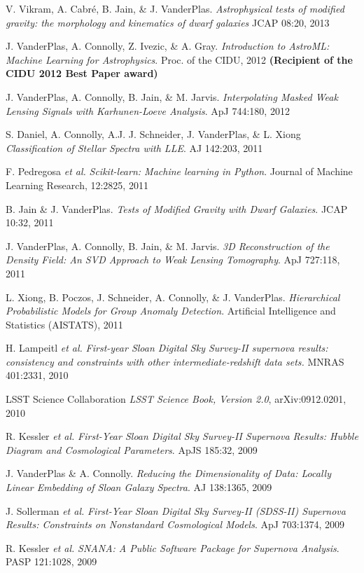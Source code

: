 \documentclass{article} %
\def\bf{\bfseries}
\def\sl{\slshape}
\begin{document}
{\begin{itemize}[leftmargin=0ex, itemsep=0ex, parsep=.5ex, labelindent=-4ex]
    \publication
      V. Vikram, A. Cabr\'{e}, B. Jain, \& J. VanderPlas.
      {\it Astrophysical tests of modified gravity:
        the morphology and kinematics of dwarf galaxies}
      JCAP 08:20, 2013

    \publication
      J. VanderPlas, A. Connolly, Z. Ivezic, \& A. Gray.
      {\sl Introduction to AstroML: Machine Learning for Astrophysics}.
      Proc. of the CIDU, 2012
      {\bf (Recipient of the CIDU 2012 Best Paper award)}

    \publication
      J. VanderPlas, A. Connolly, B. Jain, \& M. Jarvis.
      {\it Interpolating Masked Weak Lensing Signals with Karhunen-Loeve
        Analysis}.
      ApJ 744:180, 2012

    \publication
      S. Daniel, A. Connolly, A.J. J. Schneider, J. VanderPlas, \& L. Xiong
      {\sl Classification of Stellar Spectra with LLE}.
      AJ 142:203, 2011

    \publication
      F. Pedregosa {\sl et al.}
      {\sl Scikit-learn: Machine learning in Python}.
      Journal of Machine Learning Research, 12:2825, 2011

    \publication
      B. Jain \& J. VanderPlas.
      {\sl Tests of Modified Gravity with Dwarf Galaxies}.
      JCAP 10:32, 2011

    \publication
      J. VanderPlas, A. Connolly, B. Jain, \& M. Jarvis.
      {\sl 3D Reconstruction of the Density Field: An SVD Approach
        to Weak Lensing Tomography}.
      ApJ 727:118, 2011

    \publication
      L. Xiong, B. Poczos, J. Schneider, A. Connolly, \& J. VanderPlas.
      {\sl Hierarchical Probabilistic Models for Group Anomaly Detection}.
      Artificial Intelligence and Statistics (AISTATS), 2011

    \publication
      H. Lampeitl {\sl et al.}
      {\sl First-year Sloan Digital Sky Survey-II supernova results:
      consistency and constraints with other intermediate-redshift data sets.}
      MNRAS 401:2331, 2010

    \publication
      LSST Science Collaboration
      {\sl LSST Science Book, Version 2.0}, arXiv:0912.0201, 2010

    \publication
      R. Kessler {\it et al.}
      {\it First-Year Sloan Digital Sky Survey-II Supernova Results:
      Hubble Diagram and Cosmological Parameters}.
      ApJS 185:32, 2009

    \publication
      J. VanderPlas \& A. Connolly.
      {\it Reducing the Dimensionality of Data: Locally
      Linear Embedding of Sloan Galaxy Spectra}.
      AJ 138:1365, 2009

    \publication
      J. Sollerman {\sl et al.}
      {\it First-Year Sloan Digital Sky Survey-II (SDSS-II) Supernova
      Results: Constraints on Nonstandard Cosmological Models}.
      ApJ 703:1374, 2009

    \publication
      R. Kessler {\it et al.}
      {\it SNANA: A Public Software Package for Supernova Analysis}.
      PASP 121:1028, 2009

  \end{itemize}
}
\end{document}
